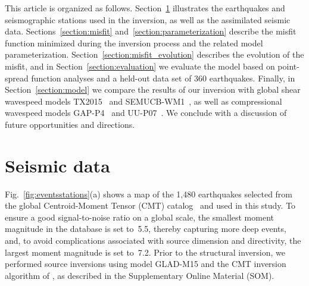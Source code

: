 \documentclass[extra,mreferee]{gji}
\begin{document}
This article is organized as follows.
Section~\ref{section:seismic data} illustrates the earthquakes and seismographic stations used in the inversion,
as well as the assimilated seismic data. 
Sections~\ref{section:misfit} and~\ref{section:parameterization} describe the misfit function minimized during the inversion process
and the related model parameterization.
Section~\ref{section:misfit_evolution} describes the evolution of the misfit, and in Section~\ref{section:evaluation} we evaluate the model based on point-spread function analyses and a held-out data set of 360 earthquakes.
Finally, in Section~\ref{section:model}
we compare the results of our inversion with global shear wavespeed models 
TX2015~\citep{TX2015} and SEMUCB-WM1~\citep{french2015broad},
as well as compressional wavespeed models GAP-P4~\citep{fukao2013subducted} and UU-P07~\citep{van2018atlas}.
We conclude with a discussion of future opportunities and directions.

\section{Seismic data}
\label{section:seismic data}

Fig.~\ref{fig:eventsstations}(a) shows a map of the 1,480 earthquakes
selected from the global Centroid-Moment Tensor (CMT) catalog~\citep[e.g.,][]{ekstrom2012global}
and used in this study.
To ensure a good signal-to-noise ratio on a global scale,
the smallest moment magnitude in the database is set to~5.5,
thereby capturing more deep events,
and, to avoid complications associated with source dimension and directivity,
the largest moment magnitude is set to~7.2.
Prior to the structural inversion,
we performed source inversions using model GLAD-M15 and the CMT inversion algorithm of \cite{liu2004spectral},
as described in the Supplementary Online Material (SOM).
\end{document}
